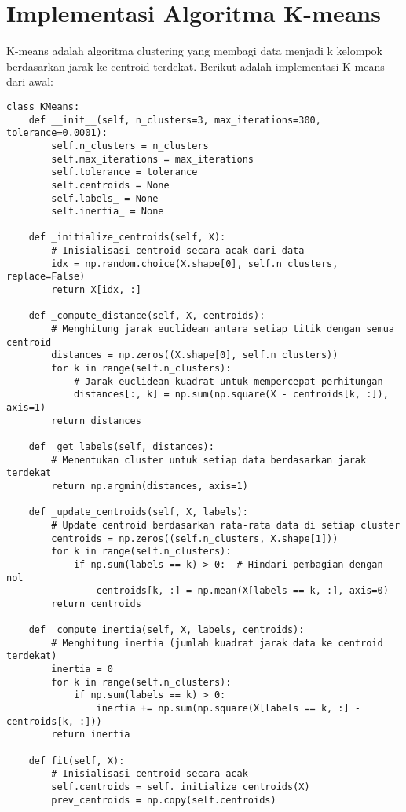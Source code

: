 \documentclass[a4paper,12pt]{article}
\begin{document}
\section{Implementasi Algoritma K-means}
K-means adalah algoritma clustering yang membagi data menjadi k kelompok berdasarkan jarak ke centroid terdekat. Berikut adalah implementasi K-means dari awal:

\begin{lstlisting}
class KMeans:
    def __init__(self, n_clusters=3, max_iterations=300, tolerance=0.0001):
        self.n_clusters = n_clusters
        self.max_iterations = max_iterations
        self.tolerance = tolerance
        self.centroids = None
        self.labels_ = None
        self.inertia_ = None
    
    def _initialize_centroids(self, X):
        # Inisialisasi centroid secara acak dari data
        idx = np.random.choice(X.shape[0], self.n_clusters, replace=False)
        return X[idx, :]
    
    def _compute_distance(self, X, centroids):
        # Menghitung jarak euclidean antara setiap titik dengan semua centroid
        distances = np.zeros((X.shape[0], self.n_clusters))
        for k in range(self.n_clusters):
            # Jarak euclidean kuadrat untuk mempercepat perhitungan
            distances[:, k] = np.sum(np.square(X - centroids[k, :]), axis=1)
        return distances
    
    def _get_labels(self, distances):
        # Menentukan cluster untuk setiap data berdasarkan jarak terdekat
        return np.argmin(distances, axis=1)
    
    def _update_centroids(self, X, labels):
        # Update centroid berdasarkan rata-rata data di setiap cluster
        centroids = np.zeros((self.n_clusters, X.shape[1]))
        for k in range(self.n_clusters):
            if np.sum(labels == k) > 0:  # Hindari pembagian dengan nol
                centroids[k, :] = np.mean(X[labels == k, :], axis=0)
        return centroids
    
    def _compute_inertia(self, X, labels, centroids):
        # Menghitung inertia (jumlah kuadrat jarak data ke centroid terdekat)
        inertia = 0
        for k in range(self.n_clusters):
            if np.sum(labels == k) > 0:
                inertia += np.sum(np.square(X[labels == k, :] - centroids[k, :]))
        return inertia
    
    def fit(self, X):
        # Inisialisasi centroid secara acak
        self.centroids = self._initialize_centroids(X)
        prev_centroids = np.copy(self.centroids)
        

\end{lstlisting}
\end{document}
